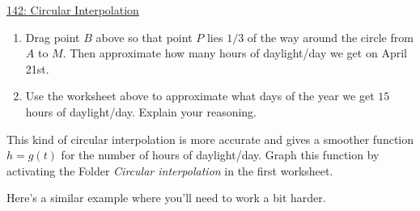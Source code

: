 \documentclass{ximera}
\begin{document}
\begin{example}
\href{https://www.desmos.com/calculator/nfsifbppzz}{142: Circular Interpolation}

\begin{enumerate}
\item Drag point $B$ above so that point $P$ lies $1/3$ of the way around the circle from $A$ to $M$. Then approximate how many hours of daylight/day we get on April 21st.
\begin{freeResponse} 
\end{freeResponse}

\item Use the worksheet above to approximate what days of the year we get $15$ hours of daylight/day. Explain your reasoning.
\begin{freeResponse}
\end{freeResponse}
\end{enumerate}

This kind of circular interpolation is more accurate and gives a smoother function $h=g(t)$ for the number of hours of daylight/day. Graph this function by activating the Folder \emph{Circular interpolation} in the first worksheet.

\end{example}


\fi

Here's a similar example where you'll need to work a bit harder.
\end{document}
